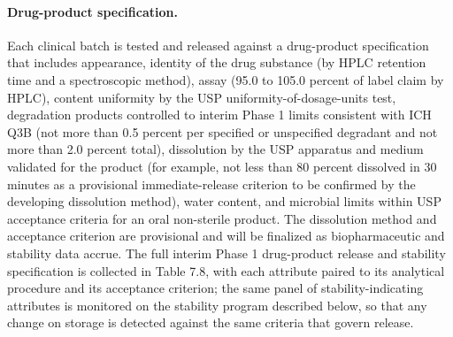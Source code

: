 \paragraph{Drug-product specification.}
Each clinical batch is tested and released against a drug-product specification
that includes appearance, identity of the drug substance (by HPLC retention time
and a spectroscopic method), assay (95.0 to 105.0 percent of label claim by HPLC),
content uniformity by the USP uniformity-of-dosage-units test, degradation
products controlled to interim Phase 1 limits consistent with ICH Q3B (not more
than 0.5 percent per specified or unspecified degradant and not more than 2.0
percent total), dissolution by the USP apparatus and medium validated for the
product (for example, not less than 80 percent dissolved in 30 minutes as a
provisional immediate-release criterion to be confirmed by the developing
dissolution method), water content, and microbial limits within USP acceptance
criteria for an oral non-sterile product. The dissolution method and acceptance
criterion are provisional and will be finalized as biopharmaceutic and stability
data accrue. The full interim Phase 1 drug-product release and stability
specification is collected in Table 7.8, with each attribute paired to its
analytical procedure and its acceptance criterion; the same panel of
stability-indicating attributes is monitored on the stability program described
below, so that any change on storage is detected against the same criteria that
govern release.

